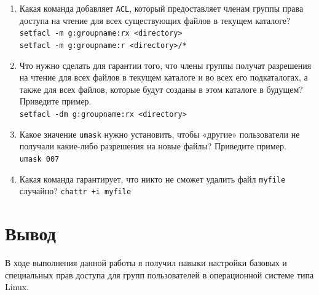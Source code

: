 \documentclass[12pt]{article}
\begin{document}
\begin{enumerate}
	\item Какая команда добавляет \texttt{ACL}, который предоставляет членам группы права доступа на чтение для всех существующих файлов в текущем каталоге?
	      \texttt{setfacl -m g:groupname:rx <directory>}\\
	      \texttt{setfacl -m g:groupname:r <directory>/*}

	\item Что нужно сделать для гарантии того, что члены группы получат разрешения на чтение для всех файлов в текущем каталоге и во всех его подкаталогах, а также для всех файлов, которые будут созданы в этом каталоге в будущем? Приведите пример.\\
	      \texttt{setfacl -dm g:groupname:rx <directory>}

	\item Какое значение \texttt{umask} нужно установить, чтобы «другие» пользователи не получали какие-либо разрешения на новые файлы? Приведите пример.\\
	      \texttt{umask 007}

	\item Какая команда гарантирует, что никто не сможет удалить файл \texttt{myfile} случайно?
	      \texttt{chattr +i myfile}

\end{enumerate}

\section{Вывод}
В ходе выполнения данной работы я получил навыки настройки базовых и специальных прав доступа для групп пользователей в операционной системе типа Linux.
\end{document}
